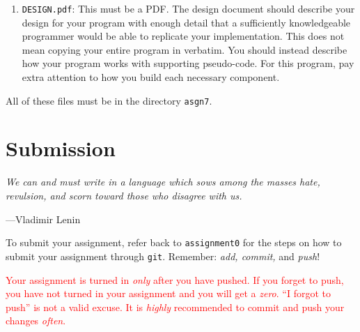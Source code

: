 \documentclass{article}
\begin{document}
\begin{enumerate}
\item \texttt{DESIGN.pdf}: This must be a PDF. The design document
should describe your design for your program with enough detail
that a sufficiently knowledgeable programmer would be able to
replicate your implementation. This does not mean copying your
entire program in verbatim. You should instead describe how your
program works with supporting pseudo-code. For this program, pay
extra attention to how you build each necessary component.

\end{enumerate}

All of these files must be in the directory \texttt{asgn7}.

\section{Submission}
\epigraph{\emph{We can and must write in a language which sows among the
masses hate, revulsion, and scorn toward those who disagree with
us.}}{---Vladimir Lenin}

\noindent
To submit your assignment, refer back to \texttt{assignment0} for
the steps on how to submit your assignment through \texttt{git}.
Remember: \emph{add, commit,} and \emph{push}!

\textcolor{red}{Your assignment is turned in \emph{only} after you
have pushed.  If you forget to push, you have not turned in your
assignment and you will get a \emph{zero}. ``I forgot to push'' is
not a valid excuse. It is \emph{highly} recommended to commit and
push your changes \emph{often}.}
\end{document}
